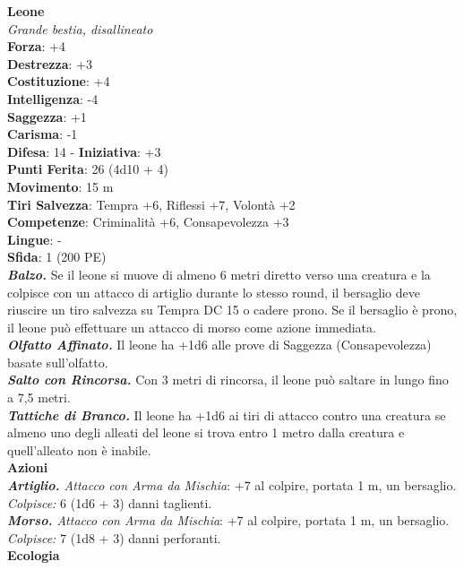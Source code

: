\begin{multicols}{2}
\medskip\textbf{Leone}\\
\emph{Grande bestia, disallineato}\\
\textbf{Forza}: +4\\
\textbf{Destrezza}: +3\\
\textbf{Costituzione}: +4\\
\textbf{Intelligenza}: -4\\
\textbf{Saggezza}: +1\\
\textbf{Carisma}: -1\\
\textbf{Difesa}: 14 - \textbf{Iniziativa}: +3\\
\textbf{Punti Ferita}: 26 (4d10 + 4)\\
\textbf{Movimento}: 15 m\\
\textbf{Tiri Salvezza}: Tempra +6, Riflessi +7, Volontà +2 \\
\textbf{Competenze}: Criminalità +6, Consapevolezza +3\\
\textbf{Lingue}: -\\
\textbf{Sfida}: 1 (200 PE)\smallskip\\
\emph{\textbf{Balzo.}} Se il leone si muove di almeno 6 metri diretto verso una creatura e la colpisce con un attacco di artiglio durante lo stesso round, il bersaglio deve riuscire un tiro salvezza su Tempra DC  15 o cadere prono. Se il bersaglio è prono, il leone può effettuare un attacco di morso come azione immediata.\\
\emph{\textbf{Olfatto Affinato.}} Il leone ha +1d6 alle prove di Saggezza (Consapevolezza) basate sull'olfatto.\\
\emph{\textbf{Salto con Rincorsa.}} Con 3 metri di rincorsa, il leone può saltare in lungo fino a 7,5 metri.\\
\emph{\textbf{Tattiche di Branco.}} Il leone ha +1d6 ai tiri di attacco contro una creatura se almeno uno degli alleati del leone si trova entro 1 metro dalla creatura e quell'alleato non è inabile.\\
\smallskip\textbf{Azioni}\\
\emph{\textbf{Artiglio.} Attacco con Arma da Mischia}: +7 al colpire, portata 1 m, un bersaglio.\\
\emph{Colpisce:} 6 (1d6 + 3) danni taglienti.\\
\emph{\textbf{Morso.} Attacco con Arma da Mischia}: +7 al colpire, portata 1 m, un bersaglio.\\
\emph{Colpisce:} 7 (1d8 + 3) danni perforanti.\\
\textbf{Ecologia}\\

\end{multicols}
